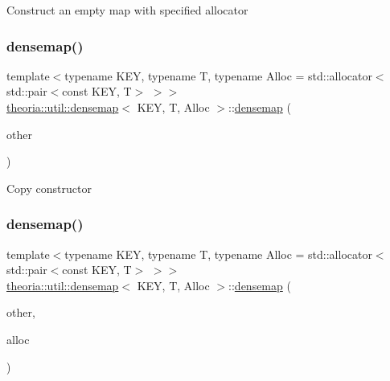Construct an empty map with specified allocator \mbox{\label{classtheoria_1_1util_1_1densemap_a8c6d546ba72e0516685424cb5c4c2467}} 
\subsubsection{\texorpdfstring{densemap()}{densemap()}\hspace{0.1cm}{\footnotesize\ttfamily [4/7]}}
{\footnotesize\ttfamily template$<$typename K\+EY, typename T, typename Alloc = std\+::allocator$<$std\+::pair$<$const K\+E\+Y, T$>$ $>$$>$ \\
\hyperlink{classtheoria_1_1util_1_1densemap}{theoria\+::util\+::densemap}$<$ K\+EY, T, Alloc $>$\+::\hyperlink{classtheoria_1_1util_1_1densemap}{densemap} (\begin{DoxyParamCaption}\item[{const \hyperlink{classtheoria_1_1util_1_1densemap}{densemap}$<$ K\+EY, T, Alloc $>$ \&}]{other }\end{DoxyParamCaption})\hspace{0.3cm}{\ttfamily [inline]}}

Copy constructor \mbox{\label{classtheoria_1_1util_1_1densemap_ae8cbc01dc2418bffff40319a80df81e7}} 
\subsubsection{\texorpdfstring{densemap()}{densemap()}\hspace{0.1cm}{\footnotesize\ttfamily [5/7]}}
{\footnotesize\ttfamily template$<$typename K\+EY, typename T, typename Alloc = std\+::allocator$<$std\+::pair$<$const K\+E\+Y, T$>$ $>$$>$ \\
\hyperlink{classtheoria_1_1util_1_1densemap}{theoria\+::util\+::densemap}$<$ K\+EY, T, Alloc $>$\+::\hyperlink{classtheoria_1_1util_1_1densemap}{densemap} (\begin{DoxyParamCaption}\item[{const \hyperlink{classtheoria_1_1util_1_1densemap}{densemap}$<$ K\+EY, T, Alloc $>$ \&}]{other,  }\item[{\hyperlink{classtheoria_1_1util_1_1densemap_ae12f4688e504c8759e23759ad7272c94}{allocator\+\_\+type}}]{alloc }\end{DoxyParamCaption})\hspace{0.3cm}{\ttfamily [inline]}}

